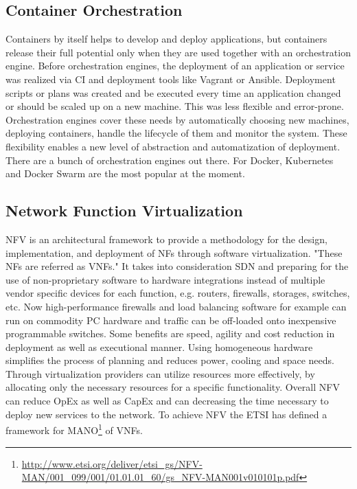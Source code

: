 \subsection{Container Orchestration}
Containers by itself helps to develop and deploy applications, but containers release their full potential only when they are used together with an orchestration engine.
Before orchestration engines, the deployment of an application or service was realized via \ac{CI} and deployment tools like Vagrant or Ansible.
Deployment scripts or plans was created and be executed every time an application changed or should be scaled up on a new machine.
This was less flexible and error-prone.
Orchestration engines cover these needs by automatically choosing new machines, deploying containers, handle the lifecycle of them and monitor the system.
These flexibility enables a new level of abstraction and automatization of deployment.
There are a bunch of orchestration engines out there.
For Docker, Kubernetes and Docker Swarm are the most popular at the moment.


\subsection{Network Function Virtualization}
\ac{NFV} is an architectural framework to provide a methodology for the design, implementation, and deployment of \acp{NF} through software virtualization.\cite[cf.][p. 8]{ETSI:NFV:2013}\cite[cf.]{Rivenes:2014}
"These \acp{NF} are referred as \acp{VNF}."\cite[p. 8]{ETSI:NFV:2013}
It takes into consideration \ac{SDN} and preparing for the use of non-proprietary software to hardware integrations instead of multiple vendor specific devices for each function, e.g. routers, firewalls, storages, switches, etc.\cite[cf.]{Rivenes:2014}
Now high-performance firewalls and load balancing software for example can run on commodity PC hardware and traffic can be off-loaded onto inexpensive programmable switches.\cite[cf.]{Noble:2015}
Some benefits are speed, agility and cost reduction in deployment as well as executional manner.\cite[cf.]{Noble:2015}
Using homogeneous hardware simplifies the process of planning and reduces power, cooling and space needs.\cite[cf.]{Noble:2015}
Through virtualization providers can utilize resources more effectively, by allocating only the necessary resources for a specific functionality.\cite[cf.]{Noble:2015}
Overall \ac{NFV} can reduce \ac{OpEx} as well as \ac{CapEx} and can decreasing the time necessary to deploy new services to the network.\cite[cf.]{Noble:2015}
To achieve \ac{NFV} the \ac{ETSI} has defined a framework for \ac{MANO}\footnote{\url{http://www.etsi.org/deliver/etsi_gs/NFV-MAN/001_099/001/01.01.01_60/gs_NFV-MAN001v010101p.pdf}} of \acp{VNF}.

